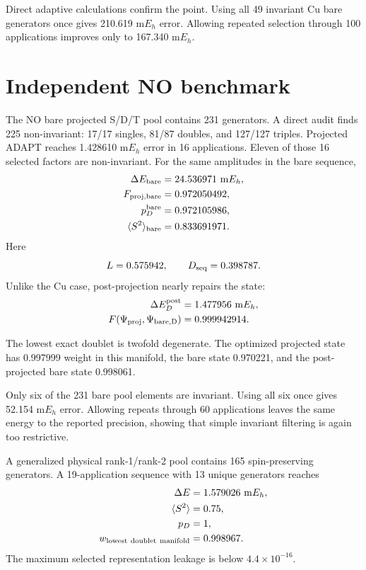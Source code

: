 \documentclass[
 aip,
 jcp,
 amsmath,amssymb,
 preprint
]{revtex4-2}
\begin{document}
Direct adaptive calculations confirm the point.
Using all 49 invariant Cu bare generators once gives 210.619 m$E_h$ error.
Allowing repeated selection through 100 applications improves only to 167.340 m$E_h$.

\section{Independent NO benchmark}

The NO bare projected S/D/T pool contains 231 generators.
A direct audit finds 225 non-invariant:
17/17 singles, 81/87 doubles, and 127/127 triples.
Projected ADAPT reaches 1.428610 m$E_h$ error in 16 applications.
Eleven of those 16 selected factors are non-invariant.
For the same amplitudes in the bare sequence,
\begin{align}
\Delta E_{\rm bare}&=24.536971~{\rm m}E_h,\\
F_{\rm proj,bare}&=0.972050492,\\
p_D^{\rm bare}&=0.972105986,\\
\langle S^2\rangle_{\rm bare}&=0.833691971.
\end{align}
Here
\begin{equation}
L=0.575942,\qquad D_{\rm seq}=0.398787.
\end{equation}
Unlike the Cu case, post-projection nearly repairs the state:
\begin{align}
\Delta E_D^{\rm post}&=1.477956~{\rm m}E_h,\\
F(\Psi_{\rm proj},\Psi_{\rm bare,D})&=0.999942914.
\end{align}

The lowest exact doublet is twofold degenerate.
The optimized projected state has 0.997999 weight in this manifold, the bare state 0.970221, and the post-projected bare state 0.998061.

Only six of the 231 bare pool elements are invariant.
Using all six once gives 52.154 m$E_h$ error.
Allowing repeats through 60 applications leaves the same energy to the reported precision, showing that simple invariant filtering is again too restrictive.

A generalized physical rank-1/rank-2 pool contains 165 spin-preserving generators.
A 19-application sequence with 13 unique generators reaches
\begin{align}
\Delta E&=1.579026~{\rm m}E_h,\\
\langle S^2\rangle&=0.75,\\
p_D&=1,\\
w_{\rm lowest\ doublet\ manifold}&=0.998967.
\end{align}
The maximum selected representation leakage is below $4.4\times10^{-16}$.
\end{document}

